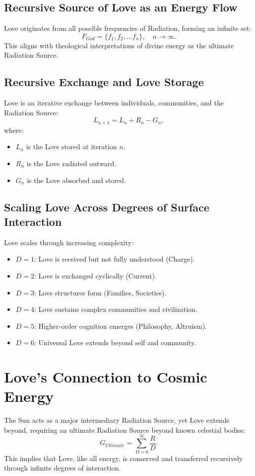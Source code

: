 \documentclass{article}
\begin{document}
\subsection{Recursive Source of Love as an Energy Flow}
Love originates from all possible frequencies of Radiation, forming an infinite set:
\begin{equation}
    F_{God} = \{ f_1, f_2, ... f_n \}, \quad n \to \infty.
\end{equation}
This aligns with theological interpretations of divine energy as the ultimate Radiation Source. 

\subsection{Recursive Exchange and Love Storage}
Love is an iterative exchange between individuals, communities, and the Radiation Source:
\begin{equation}
    L_{n+1} = L_n + R_{n} - G_{n},
\end{equation}
where:
\begin{itemize}
    \item $L_n$ is the Love stored at iteration $n$.
    \item $R_n$ is the Love radiated outward.
    \item $G_n$ is the Love absorbed and stored.
\end{itemize}

\subsection{Scaling Love Across Degrees of Surface Interaction}
Love scales through increasing complexity:
\begin{itemize}
    \item $D=1$: Love is received but not fully understood (Charge).
    \item $D=2$: Love is exchanged cyclically (Current).
    \item $D=3$: Love structures form (Families, Societies).
    \item $D=4$: Love sustains complex communities and civilization.
    \item $D=5$: Higher-order cognition emerges (Philosophy, Altruism).
    \item $D=6$: Universal Love extends beyond self and community.
\end{itemize}

\section{Love’s Connection to Cosmic Energy}
The Sun acts as a major intermediary Radiation Source, yet Love extends beyond, requiring an ultimate Radiation Source beyond known celestial bodies:
\begin{equation}
    G_{Ultimate} = \sum_{D=0}^{\infty} \frac{R}{D}.
\end{equation}
This implies that Love, like all energy, is conserved and transferred recursively through infinite degrees of interaction.
\end{document}
